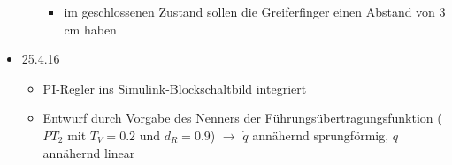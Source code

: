 \documentclass[a4paper,12pt]{article}
\begin{document}
\begin{itemize}
\begin{itemize}
\begin{itemize}
			\item im geschlossenen Zustand sollen die Greiferfinger einen Abstand von 3 cm haben
		\end{itemize}
	\end{itemize}
	\item 25.4.16
		\begin{itemize}
			\item PI-Regler ins Simulink-Blockschaltbild integriert
			\item Entwurf durch Vorgabe des Nenners der Führungsübertragungsfunktion ($PT_2$ mit $T_V = 0.2$ und $d_R = 0.9$) $\rightarrow$ $\dot{q}$ annähernd sprungförmig, $q$ annähernd linear
		\end{itemize}
\end{itemize}
\end{document}
